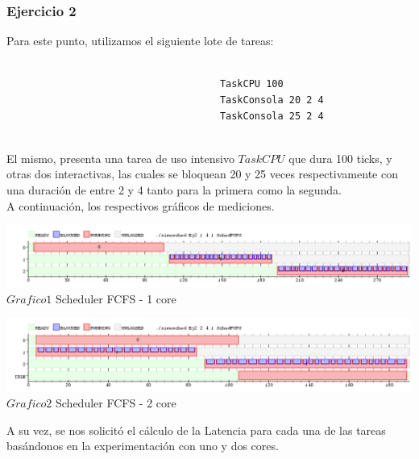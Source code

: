 \subsubsection[Resolución Ejercicio 2]{Ejercicio 2}

\indent Para este punto, utilizamos el siguiente lote de tareas:
\begin{verbatim}
 
                                     TaskCPU 100
                                     TaskConsola 20 2 4
                                     TaskConsola 25 2 4


\end{verbatim}

\indent El mismo, presenta una tarea de uso intensivo $TaskCPU$ que dura 100 ticks, y otras dos interactivas, las cuales se
bloquean 20 y 25 veces respectivamente con una duración de entre 2 y 4 tanto para la primera como la segunda.\\
A continuación, los respectivos gráficos de mediciones.


\vspace*{0.3cm} \vspace*{0.3cm}
  \begin{center}
 \includegraphics[scale=0.5]{./Test/ej2_1.png}
 { $Grafico 1$ Scheduler FCFS - 1 core }
 \end{center}
  \vspace*{0.3cm}
 
  
\vspace*{0.3cm} \vspace*{0.3cm}
  \begin{center}
 \includegraphics[scale=0.5]{./Test/ej2_2.png}
 { $Grafico 2$ Scheduler FCFS - 2 core }
 \end{center}
  \vspace*{0.3cm}

A su vez, se nos solicit\'{o} el c\'{a}lculo de la Latencia para cada una de las tareas bas\'{a}ndonos en la 
experimentaci\'{o}n con uno y dos cores.\\

